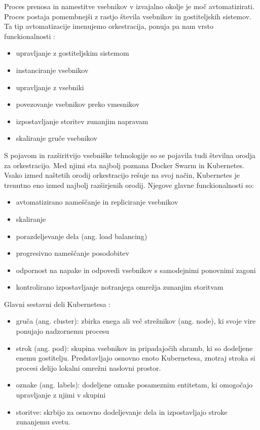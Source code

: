 \documentclass[a4paper, 12pt]{book}
\begin{document}
Proces prenosa in namestitve vsebnikov v izvajalno okolje je moč avtomatizirati.
Proces postaja pomembnejši z rastjo števila vsebnikov in gostiteljskih sistemov. 
Ta tip avtomatizacije imenujemo orkestracija, ponuja pa nam vrsto funckionalnosti \cite{mongoKubernetes}:
\begin{itemize}
	\item upravljanje z gostiteljskim sistemom
	\item instanciranje vsebnikov
	\item upravljanje z vsebniki
	\item povezovanje vsebnikov preko vmesnikov
	\item izpostavljanje storitev zunanjim napravam
	\item skaliranje gruče vsebnikov
\end{itemize}

S pojavom in razširitvijo vsebniške tehnologije so se pojavila tudi številna orodja za orkestracijo.
Med njimi sta najbolj poznana Docker Swarm in Kubernetes.
Vsako izmed naštetih orodij orkestracijo rešuje na svoj način, Kubernetes je trenutno eno izmed najbolj razširjenih orodij.
Njegove glavne funckionalnosti so:
\begin{itemize}
	\item avtomatizirano nameščanje in repliciranje vsebnikov
	\item skaliranje
	\item porazdeljevanje dela (ang. load balancing)
	\item progresivno nameščanje posodobitev
	\item odpornost na napake in odpovedi vsebnikov s samodejnimi ponovnimi zagoni
	\item kontrolirano izpostavljanje notranjega omrežja zunanjim storitvam
\end{itemize}

Glavni sestavni deli Kubernetesa \cite{mongoKubernetes}: 
\begin{itemize}
	\item gruča (ang. cluster): zbirka enega ali več strežnikov (ang. node), ki svoje vire ponujajo nadzornemu procesu
	\item strok (ang. pod): skupina vsebnikov in pripadajočih shramb, ki so dodeljene enemu gostitelju. Predstavljajo osnovno enoto Kubernetesa, znotraj stroka si procesi delijo lokalni omrežni naslovni prostor.
	\item oznake (ang. labels): dodeljene oznake posameznim entitetam, ki omogočajo upravljanje z njimi v skupini
	\item storitve: skrbijo za osnovno dodeljevanje dela in izpostavljajo stroke zunanjemu svetu.
\end{itemize}
\end{document}
